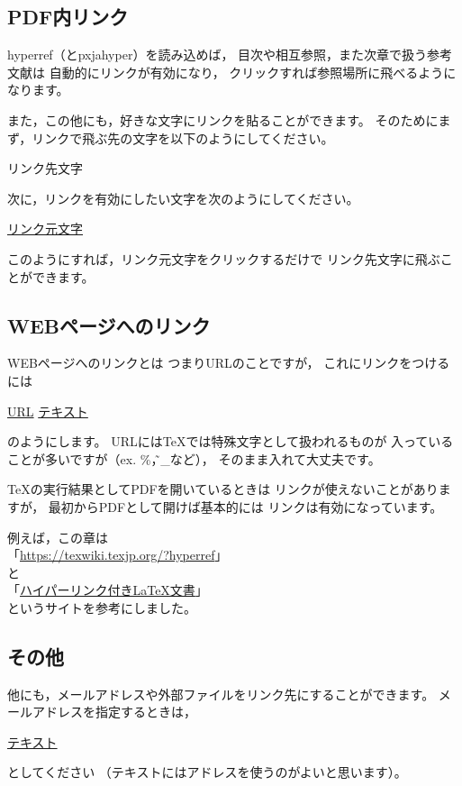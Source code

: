 \documentclass[class=jreport, crop=false, preview=false, dvipdfmx, fleqn]{standalone}
\begin{document}
\subsection{PDF内リンク}
hyperref（とpxjahyper）を読み込めば，
目次や相互参照，また次章で扱う参考文献は
自動的にリンクが有効になり，
クリックすれば参照場所に飛べるようになります。

また，この他にも，好きな文字にリンクを貼ることができます。
そのためにまず，リンクで飛ぶ先の文字を以下のようにしてください。
\begin{ITeX}
\hypertarget{リンク名}{リンク先文字}
\end{ITeX}
次に，リンクを有効にしたい文字を次のようにしてください。
\begin{ITeX}
\hyperlink{リンク名}{リンク元文字}
\end{ITeX}
このようにすれば，リンク元文字をクリックするだけで
リンク先文字に飛ぶことができます。


\subsection{WEBページへのリンク}
WEBページへのリンクとは
つまりURLのことですが，
これにリンクをつけるには
\begin{ITeX}
\url{URL}
\href{URL}{テキスト}
\end{ITeX}
のようにします。
URLには{\TeX}では特殊文字として扱われるものが
入っていることが多いですが（ex. \%，\~，\_など），
そのまま入れて大丈夫です。

{\TeX}の実行結果としてPDFを開いているときは
リンクが使えないことがありますが，
最初からPDFとして開けば基本的には
リンクは有効になっています。

例えば，この章は \\
「\url{https://texwiki.texjp.org/?hyperref}」\\
と \\
「\href{http://www.isc.meiji.ac.jp/~mizutani/tex/link_slide/hyperlink.html}{ハイパーリンク付きLaTeX文書}」\\
というサイトを参考にしました。


\subsection{その他}
他にも，メールアドレスや外部ファイルをリンク先にすることができます。
メールアドレスを指定するときは，
\begin{ITeX}
\href{mailto:アドレス}{テキスト}
\end{ITeX}
としてください
（テキストにはアドレスを使うのがよいと思います）。
\end{document}
